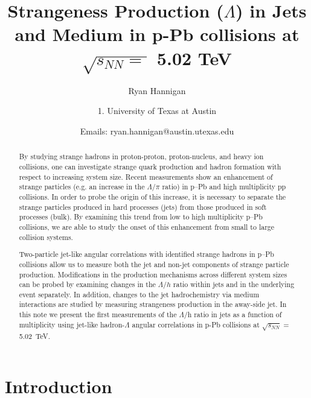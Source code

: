 \documentclass[ALICE,manyauthors]{ALICE_analysis_notes}
\begin{document}
%
%
%
\begin{titlepage}
%
\PHdate{\today}
%
\title{Strangeness Production ($\Lambda$) in Jets and Medium in p-Pb collisions at $\sqrt{s_{NN} = }$ 5.02 TeV}
%
\author{Ryan Hannigan}
\author{
1. University of Texas at Austin\\
}
\author{Emails: ryan.hannigan@austin.utexas.edu}
%
%
\begin{abstract}
By studying strange hadrons in proton-proton, proton-nucleus, and heavy ion collisions, one can investigate strange quark production and hadron formation with respect to increasing system size. Recent measurements show an enhancement of strange particles (e.g. an increase in the $\Lambda$/$\pi$ ratio) in p--Pb and high multiplicity pp collisions. In order to probe the origin of this increase, it is necessary to separate the strange particles produced in hard processes (jets) from those produced in soft processes (bulk). By examining this trend from low to high multiplicity p--Pb collisions, we are able to study the onset of this enhancement from small to large collision systems.

Two-particle jet-like angular correlations with identified strange hadrons in p--Pb collisions allow us to measure both the jet and non-jet components of strange particle production. Modifications in the production mechanisms across different system sizes can be probed by examining changes in the $\Lambda/h$ ratio within jets and in the underlying event separately. In addition, changes to the jet hadrochemistry via medium interactions are studied by measuring strangeness production in the away-side jet. In this note we present the first measurements of the $\Lambda$/h ratio in jets as a function of multiplicity using jet-like hadron-$\Lambda$ angular correlations in p-Pb collisions at $\sqrt{s_{NN}} =$ \SI{5.02}{TeV}.
\end{abstract}
\end{titlepage}
%
\tableofcontents

\section{Introduction}
\end{document}
